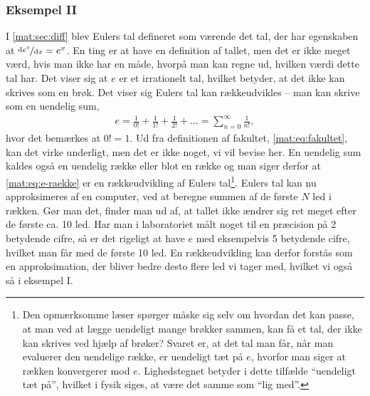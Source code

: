 \subsubsection{Eksempel II}
I \cref{mat:sec:diff} blev Eulers tal defineret som værende det tal, der har egenskaben at $\nicefrac{\dd{e^x}}{\dd{x}} = e^x$. En ting er at have en definition af tallet, men det er ikke meget værd, hvis man ikke har en måde, hvorpå man kan regne ud, hvilken værdi dette tal har. Det viser sig at $e$ er et irrationelt tal, hvilket betyder, at det ikke kan skrives som en brøk. Det viser sig Eulers tal kan rækkeudvikles -- man kan skrive som en uendelig sum,
%
\begin{align} \label{mat:eq:e-raekke}
    e = \frac{1}{0!} + \frac{1}{1!} + \frac{1}{2!} + ... = \sum_{n=0}^\infty \frac{1}{n!},
\end{align}
%
hvor det bemærkes at $0! = 1$. Ud fra definitionen af fakultet, \cref{mat:eq:fakultet}, kan det virke underligt, men det er ikke noget, vi vil bevise her. En uendelig sum kaldes også en uendelig række eller blot en række og man siger derfor at \cref{mat:eq:e-raekke} er en rækkeudvikling af Eulers tal\footnote{Den opmærksomme læser spørger måske sig selv om hvordan det kan passe, at man ved at lægge uendeligt mange brøkker sammen, kan få et tal, der ikke kan skrives ved hjælp af brøker? Svaret er, at det tal man får, når man evaluerer den uendelige række, er uendeligt tæt på $e$, hvorfor man siger at rækken konvergerer mod $e$. Lighedstegnet betyder i dette tilfælde ``uendeligt tæt på'', hvilket i fysik siges, at være det samme som ``lig med''.}. Eulers tal kan nu approksimeres af en computer, ved at beregne summen af de første $N$ led i rækken. Gør man det, finder man ud af, at tallet ikke ændrer sig ret meget efter de første ca. 10 led. Har man i laboratoriet målt noget til en præcision på 2 betydende cifre, så er det rigeligt at have $e$ med eksempelvis 5 betydende cifre, hvilket man får med de første 10 led. En rækkeudvikling kan derfor forstås som en approksimation, der bliver bedre desto flere led vi tager med, hvilket vi også så i eksempel I. \\


